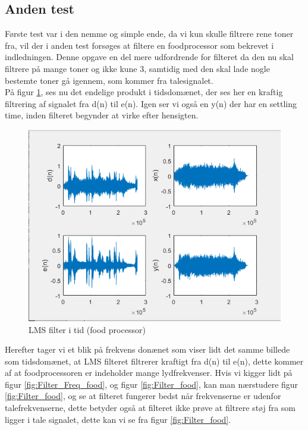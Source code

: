 \subsection{Anden test}
Første test var i den nemme og simple ende, da vi kun skulle filtrere rene toner fra, vil der i anden test forsøges at filtere en foodprocessor som bekrevet i indledningen. Denne opgave en del mere udfordrende for filteret da den nu skal filtrere på mange toner og ikke kune 3, samtidig med den skal lade nogle bestemte toner gå igennem, som kommer fra talesignalet. \\
På figur \ref{fig:Filter_time_food}, ses nu det endelige produkt i tidsdomænet, der ses her en kraftig filtrering af signalet fra d(n) til e(n). Igen ser vi også en y(n) der har en settling time, inden filteret begynder at virke efter hensigten. 

\begin{figure}[H]
	\centering
	\includegraphics[width = 400pt]{Img/Filter_time_food}
	\caption{LMS filter i tid (food processor)}
	\label{fig:Filter_time_food}
\end{figure}
\newpage

Herefter tager vi et blik på frekvens donænet som viser lidt det samme billede som tidsdomænet, at LMS filteret filtrerer kraftigt fra d(n) til e(n), dette kommer af at foodprocessoren er indeholder mange lydfrekvenser. Hvis vi kigger lidt på figur \ref{fig:Filter_Freq_food}, og figur \ref{fig:Filter_food}, kan man nærstudere figur \ref{fig:Filter_food}, og se at filteret fungerer bedst når frekvenserne er udenfor talefrekvenserne, dette betyder også at filteret ikke prøve at filtrere støj fra som ligger i tale signalet, dette kan vi se fra figur \ref{fig:Filter_food}.

